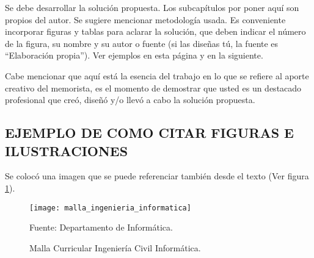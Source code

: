
Se debe desarrollar la solución propuesta. Los subcapítulos por poner aquí son propios del autor. Se sugiere mencionar metodología usada. Es conveniente incorporar figuras y tablas para aclarar la solución, que deben indicar el número de la figura, su nombre y su autor o fuente (si las diseñas tú, la fuente es ``Elaboración propia''). Ver ejemplos en esta página y en la siguiente.

Cabe mencionar que aquí está la esencia del trabajo en lo que se refiere al aporte creativo del memorista, es el momento de demostrar que usted es un destacado profesional que creó, diseñó y/o llevó a cabo la solución propuesta.

\subsection{EJEMPLO DE COMO CITAR FIGURAS E ILUSTRACIONES}

Se colocó una imagen que se puede referenciar también desde el texto (Ver figura \ref{fig:malla}).

\begin{figure}[h]
\centering
\texttt{[image: malla\_ingenieria\_informatica]}
\caption{\label{fig:malla} Malla Curricular Ingeniería Civil Informática.} Fuente: Departamento de Informática.
\end{figure}
